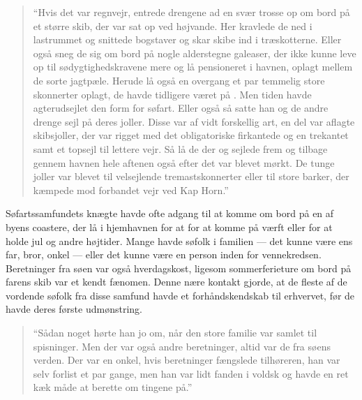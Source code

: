 \begin{quote}
    ``Hvis det var regnvejr, entrede drengene ad en svær trosse op om bord på
    et større skib, der var sat op ved højvande. Her kravlede de ned i
    lastrummet og snittede bogstaver og skar skibe ind i træskotterne. Eller
    også sneg de sig om bord på nogle alderstegne galeaser, der ikke kunne
    leve op til sødygtighedskravene mere og lå pensioneret i havnen, oplagt
    mellem de sorte jagtpæle. Herude lå også en overgang et par temmelig store
    skonnerter oplagt, de havde tidligere været på . Men tiden
    havde agterudsejlet den form for søfart. Eller også så satte han og de
    andre drenge sejl på deres joller. Disse var af vidt forskellig art, en
    del var aflagte skibsjoller, der var rigget med det obligatoriske
    firkantede  og en
    trekantet  samt et topsejl til lettere
    vejr. Så lå de der og sejlede frem og tilbage gennem havnen hele aftenen
    også efter det var blevet mørkt. De tunge joller var blevet til
    velsejlende tremastskonnerter eller til store barker, der kæmpede mod
    forbandet vejr ved Kap Horn.''
\end{quote}

Søfartssamfundets knægte havde ofte adgang til at komme om bord på en af
byens coastere, der lå i hjemhavnen for at for at komme på værft eller for
at holde jul og andre højtider. Mange havde søfolk i familien --- det kunne
være ens far, bror, onkel --- eller det kunne være en person inden for
vennekredsen. Beretninger fra søen var også hverdagskost, ligesom
sommerferieture om bord på farens skib var et kendt fænomen.  Denne nære
kontakt gjorde, at de fleste af de vordende søfolk fra disse samfund havde
et forhåndskendskab til erhvervet, før de havde deres første udmønstring. 

\begin{quote}
    ``Sådan noget hørte han jo om, når den store familie var samlet til
    spisninger. Men der var også andre beretninger, altid var de fra søens
    verden. Der var en onkel, hvis beretninger fængslede tilhøreren, han var
    selv forlist et par gange, men han var lidt fanden i voldsk og havde en
    ret kæk måde at berette om tingene på.''
\end{quote}

